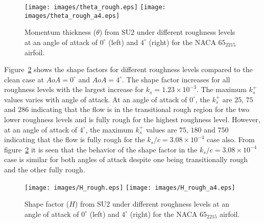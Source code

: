 \begin{figure}[h!]
    \centering
    \captionsetup{justification=centering}
    \texttt{[image: images/theta\_rough.eps]} 
    \texttt{[image: images/theta\_rough\_a4.eps]}
    \caption{Momentum thickness ($\theta$) from SU2 under different roughness levels at an angle of attack of $0^{\circ}$ (left) and $4^{\circ}$ (right) for the NACA $65_2215$ airfoil.}
    \label{fig:theta_rough}
\end{figure}
Figure~\ref{fig:H_rough} shows the shape factors for different roughness levels compared to the clean case at $AoA=0^{\circ}$ and $AoA=4^{\circ}$. The shape factor increases for all roughness levels with the largest increase for $k_s=1.23\times10^{-3}$. The maximum $k_s^+$ values varies with angle of attack. At an angle of attack of $0^{\circ}$, the $k_s^+$ are $25$, $75$ and $286$ indicating that the flow is in the transitional rough region for the two lower roughness levels and is fully rough for the highest roughness level. However, at an angle of attack of $4^{\circ}$, the maximum $k_s^+$ values are $75$, $180$ and $750$ indicating that the flow is fully rough for the $k_s/c = 3.08\times 10^{-4}$ case also. From figure~\ref{fig:H_rough} it is seen that the behavior of the shape factor in the $k_s/c = 3.08\times 10^{-4}$ case is similar for both angles of attack despite one being transitionally rough and the other fully rough. 
\begin{figure}[h!]
    \centering
    \captionsetup{justification=centering}
    \texttt{[image: images/H\_rough.eps]} 
    \texttt{[image: images/H\_rough\_a4.eps]} 
    \caption{Shape factor ($H$) from SU2 under different roughness levels at an angle of attack of $0^{\circ}$ (left) and $4^{\circ}$ (right) for the NACA $65_2215$ airfoil.}
    \label{fig:H_rough}
\end{figure}

